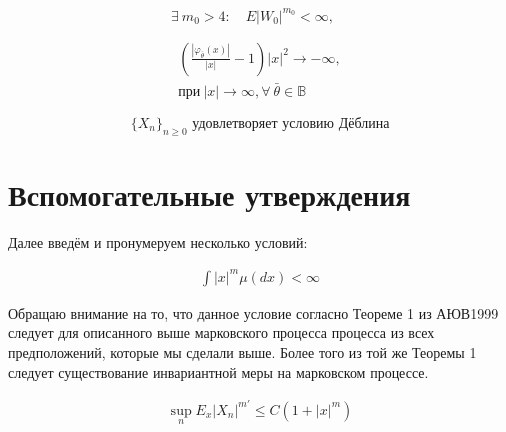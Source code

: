 \begin{equation} \label{assumption3}
    \exists \ m_0 > 4 : \quad E\left|W_0\right|^{m_0} < \infty, \quad
\end{equation}

\begin{equation} \label{assumption4}
    \begin{split}
         \left(\frac{\left|\varphi_{\bar{\theta}}(x)\right|}{|x|} - 1\right)\left|x\right|^2 \rightarrow -\infty, \\ \text{при} \ |x| \rightarrow \infty, \forall \ \bar{\theta}\in \mathbb{B}
     \end{split}
\end{equation}

\begin{equation} \label{assumption5}
    \{X_n\}_{n \geqslant 0} \text{ удовлетворяет условию Дёблина}
\end{equation}


\newpage

\section{Вспомогательные утверждения}

Далее введём и пронумеруем несколько условий:

\begin{equation} \label{measure_limiting}
    \begin{split}
        \int |x|^m \mu (dx) < \infty
    \end{split}
\end{equation}

Обращаю внимание на то, что данное условие согласно Теореме 1 из АЮВ1999 следует для описанного выше марковского процесса процесса из всех предположений, которые мы сделали выше. Более того из той же Теоремы 1 следует существование инвариантной меры на марковском процессе.

\begin{equation} \label{moments_asymptotic}
    \begin{split}
        \sup_n E_x \left| X_n \right| ^{m'} \le C \left( 1 + |x|^m \right)
    \end{split}
\end{equation}


